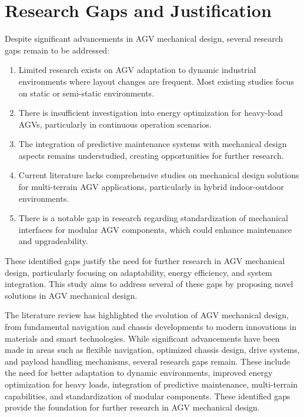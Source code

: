 \documentclass[../../main]{subfiles}
\begin{document}
\section{Research Gaps and Justification}
Despite significant advancements in AGV mechanical design, several
research gaps remain to be addressed:

\begin{enumerate}
\def\labelenumi{\arabic{enumi}.}
\item
  Limited research exists on AGV adaptation to dynamic industrial
  environments where layout changes are frequent. Most existing studies
  focus on static or semi-static environments.
\item
  There is insufficient investigation into energy optimization for
  heavy-load AGVs, particularly in continuous operation scenarios.
\item
  The integration of predictive maintenance systems with mechanical
  design aspects remains understudied, creating opportunities for
  further research.
\item
  Current literature lacks comprehensive studies on mechanical design
  solutions for multi-terrain AGV applications, particularly in hybrid
  indoor-outdoor environments.
\item
  There is a notable gap in research regarding standardization of
  mechanical interfaces for modular AGV components, which could enhance
  maintenance and upgradeability.
\end{enumerate}

These identified gaps justify the need for further research in AGV
mechanical design, particularly focusing on adaptability, energy
efficiency, and system integration. This study aims to address several
of these gaps by proposing novel solutions in AGV mechanical design.

The literature review has highlighted the evolution of AGV mechanical
design, from fundamental navigation and chassis developments to modern
innovations in materials and smart technologies. While significant
advancements have been made in areas such as flexible navigation,
optimized chassis design, drive systems, and payload handling
mechanisms, several research gaps remain. These include the need for
better adaptation to dynamic environments, improved energy optimization
for heavy loads, integration of predictive maintenance, multi-terrain
capabilities, and standardization of modular components. These
identified gaps provide the foundation for further research in AGV
mechanical design.
\newpage
\end{document}
